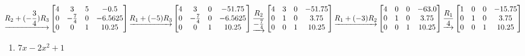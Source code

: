 \documentclass[
  11,
]{article}
\providecommand{\tightlist}{%
  \setlength{\itemsep}{0pt}\setlength{\parskip}{0pt}}
\begin{document}
\[\underrightarrow{ R_2 + (- \frac{3}{4})R_3 }
\left[\begin{matrix}4 & 3 & 5 & -0.5\\0 & - \frac{7}{4} & 0 & -6.5625\\0 & 0 & 1 & 10.25\end{matrix}\right]
\underrightarrow{ R_1 + (-5)R_3 }
\\
\left[\begin{matrix}4 & 3 & 0 & -51.75\\0 & - \frac{7}{4} & 0 & -6.5625\\0 & 0 & 1 & 10.25\end{matrix}\right]
\underrightarrow{ \frac{R_2}{- \frac{7}{4}} }
\left[\begin{matrix}4 & 3 & 0 & -51.75\\0 & 1 & 0 & 3.75\\0 & 0 & 1 & 10.25\end{matrix}\right]
\underrightarrow{ R_1 + (-3)R_2 }
\\
\left[\begin{matrix}4 & 0 & 0 & -63.0\\0 & 1 & 0 & 3.75\\0 & 0 & 1 & 10.25\end{matrix}\right]
\underrightarrow{ \frac{R_1}{4} }
\left[\begin{matrix}1 & 0 & 0 & -15.75\\0 & 1 & 0 & 3.75\\0 & 0 & 1 & 10.25\end{matrix}\right]
  \]

\begin{enumerate}
\def\labelenumi{\alph{enumi})}
\setcounter{enumi}{3}
\tightlist
\item
  \(7x-2x^2+1\)
\end{enumerate}
\end{document}
